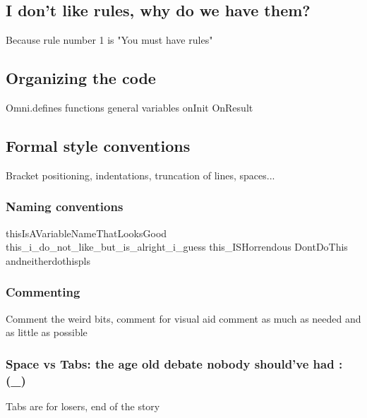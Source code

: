 \subsection{I don't like rules, why do we have them?}
Because rule number 1 is "You must have rules"
\subsection{Organizing the code}
Omni.defines \newline
functions \newline
general variables \newline
onInit \newline
OnResult 
\subsection{Formal style conventions}
Bracket positioning, indentations, truncation of lines, spaces... 
\subsubsection{Naming conventions}
thisIsAVariableNameThatLooksGood\newline
this\_i\_do\_not\_like\_but\_is\_alright\_i\_guess\newline
this\_ISHorrendous\newline
DontDoThis\newline
andneitherdothispls\newline
\subsubsection{Commenting}
Comment the weird bits, comment for visual aid
comment as much as needed and as little as possible
\subsubsection{Space vs Tabs: the age old debate nobody should've had :(\_)}
Tabs are for losers, end of the story

